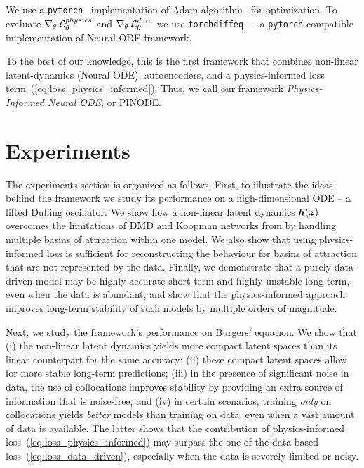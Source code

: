 We use a \texttt{pytorch}~\cite{NEURIPS2019_9015} implementation of Adam algorithm~\cite{kingma2014adam} for optimization. To evaluate $\nabla_\theta \operatorname{\mathcal{L}}^{physics}_\theta$ and $\nabla_\theta \operatorname{\mathcal{L}}^{data}_\theta$ we use \texttt{torchdiffeq}~\cite{chen2018neural} -- a \texttt{pytorch}-compatible implementation of Neural ODE framework. 

To the best of our knowledge, this is the first framework that combines non-linear latent-dynamics (Neural ODE), autoencoders, and a physics-informed loss term~(\ref{eq:loss_physics_informed}). Thus, we call our framework \textit{Physics-Informed Neural ODE}, or PINODE. 

\section{Experiments}
\label{sec:exp}
The experiments section is organized as follows. First, to illustrate the ideas behind the framework we study its performance on a high-dimensional ODE -- a lifted Duffing oscillator. We show how a non-linear latent dynamics $\boldsymbol{h}(\boldsymbol{z})$ overcomes the limitations of DMD and Koopman networks from \cite{liu2022physics} by handling multiple basins of attraction within one model. We also show that using physics-informed loss is sufficient for reconstructing the behaviour for basins of attraction that are not represented by the data. Finally, we demonstrate that a purely data-driven model may be highly-accurate short-term and highly unstable long-term, even when the data is abundant, and show that the physics-informed approach improves long-term stability of such models by multiple orders of magnitude.

Next, we study the framework's performance on Burgers' equation. We show that (i) the non-linear latent dynamics yields more compact latent spaces than its linear counterpart for the same accuracy; (ii) these compact latent spaces allow for more stable long-term predictions; (iii) in the presence of significant noise in data, the use of collocations improves stability by providing an extra source of information that is noise-free, and (iv) in certain scenarios, training \textit{only} on collocations yields \textit{better} models than training on data, even when a vast amount of data is available. The latter shows that the contribution of physics-informed loss~(\ref{eq:loss_physics_informed}) may surpass the one of the data-based loss~(\ref{eq:loss_data_driven}), especially when the data is severely limited or noisy. 

